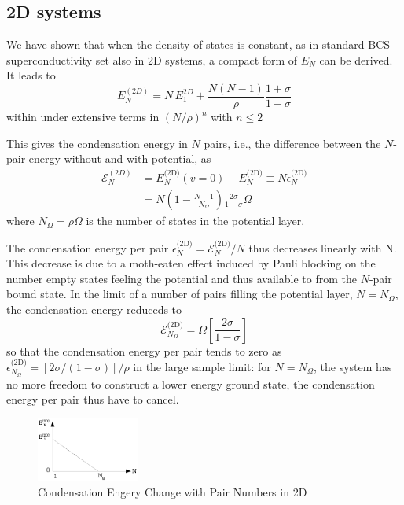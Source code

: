 \documentclass{article}
\newcommand{\td}{{\ensuremath{{\text{(2D)}}}}}
\begin{document}
\subsection{2D systems}
We have shown that when the density of states is constant, as in standard BCS superconductivity set also in 2D systems, a compact form of $E_N$ can be derived. It leads to 
\begin{equation}
 E^(2D)_N=N\,E^{2D}_1+\frac{N(N-1)}{\rho}\frac{1+\sigma}{1-\sigma}
\end{equation}
within under extensive terms in $(N/\rho)^n$ with $n\leq2$

This gives the condensation energy in $N$ pairs, i.e., the difference between the $N$-pair energy without and with potential, as 
\begin{equation}\label{eq:E2D}
\begin{split}
 \mathcal{E}^{(2D)}_N&=E_N^{\td}(v=0)-E_N^\td\equiv{}N\epsilon_N^\td\\
&=N(1-\frac{N-1}{N_\Omega})\frac{2\sigma}{1-\sigma}\Omega
\end{split}
\end{equation}
where $N_\Omega=\rho\Omega$ is the number of states in the potential layer. 

The condensation energy per pair $\epsilon^\td_N=\mathcal{E}^\td_N/N$ thus decreases linearly with N. This decrease is due to a moth-eaten effect induced by Pauli blocking on the number empty states feeling the potential and thus available to from the $N$-pair bound state.  In the limit of a number of pairs filling the potential layer, $N=N_\Omega$, the condensation energy reduceds to 
\begin{equation}
 \mathcal{E}^\td_{N_\Omega}=\Omega[\frac{2\sigma}{1-\sigma}]
\end{equation}
so that the condensation energy per pair tends to zero as $\epsilon^\td_{N_\Omega}=[2\sigma/(1-\sigma)]/\rho$ in the large sample limit: for $N=N_\Omega$, the system has no more freedom to construct a lower energy ground state, the condensation energy per pair thus have to cancel.  


\begin{figure}[htbp]
	\centering
		\includegraphics[width=0.30\textwidth]{2dCondEnergy.eps}
	\caption{Condensation Engery Change  with Pair Numbers in 2D}
	\label{fig:2dCondEnergy}
\end{figure}
\end{document}
